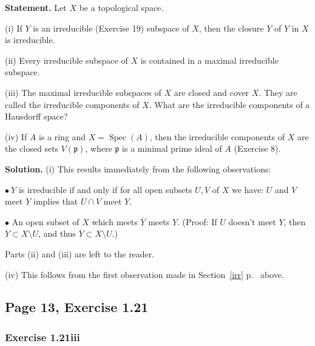 \documentclass[parskip=half,fontsize=12pt]{scrartcl}%
\newcommand{\mf}{\mathfrak}
\newcommand{\ppp}{\mf p}
\newcommand{\bu}{\bullet}
\newcommand{\Spec}{\operatorname{Spec}}\newcommand{\Sp}{\operatorname{Spec}}
\begin{document}
\textbf{Statement.} Let $X$ be a topological space.

(i) If $Y$ is an irreducible (Exercise 19) subspace of $X$, then the closure $Y$ of $Y$ in $X$ is irreducible.

(ii) Every irreducible subspace of $X$ is contained in a maximal irreducible subspace.

(iii) The maximal irreducible subspaces of $X$ are closed and cover $X$. They are called the irreducible components of $X$. What are the irreducible components of a Hausdorff space?

(iv) If $A$ is a ring and $X=\Spec(A)$, then the irreducible components of $X$ are the closed sets $V(\ppp)$, where $\ppp$ is a minimal prime ideal of $A$ (Exercise 8).

\textbf{Solution.} (i) This results immediately from the following observations:

$\bu\ Y$ is irreducible if and only if for all open subsets $U,V$ of $X$ we have: $U$ and $V$ meet $Y$ implies that $U\cap V$ meet $Y$.

$\bu$ An open subset of $X$ which meets $\overline Y$ meets $Y$. (Proof: If $U$ doesn't meet $Y$, then $Y\subset X\setminus U$, and thus $\overline Y\subset X\setminus U$.)

Parts (ii) and (iii) are left to the reader.

(iv) This follows from the first observation made in Section~\ref{irr} p.~\pageref{irr} above.

\subsection{Page 13, Exercise 1.21}%

\subsubsection{Exercise 1.21iii}\label{121iii}%
\end{document}
